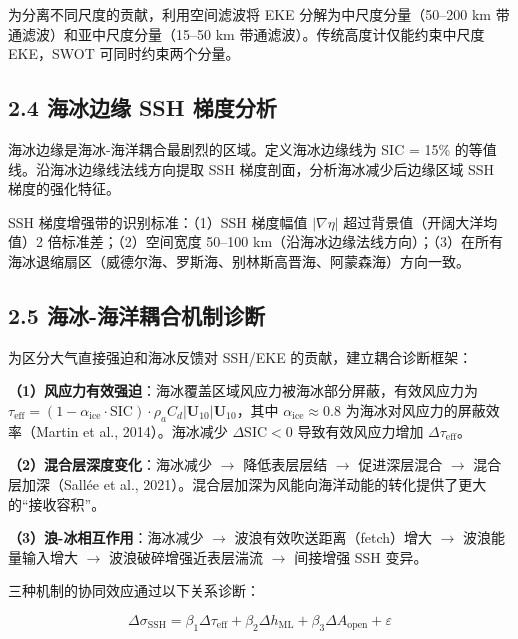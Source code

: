 \documentclass[11pt,a4paper]{article}
\begin{document}
为分离不同尺度的贡献，利用空间滤波将 EKE 分解为中尺度分量（50--200 km 带通滤波）和亚中尺度分量（15--50 km 带通滤波）。传统高度计仅能约束中尺度 EKE，SWOT 可同时约束两个分量。\par

\subsection*{2.4  海冰边缘 SSH 梯度分析}

海冰边缘是海冰-海洋耦合最剧烈的区域。定义海冰边缘线为 SIC = 15\% 的等值线。沿海冰边缘线法线方向提取 SSH 梯度剖面，分析海冰减少后边缘区域 SSH 梯度的强化特征。

SSH 梯度增强带的识别标准：（1）SSH 梯度幅值 $|\nabla\eta|$ 超过背景值（开阔大洋均值）2 倍标准差；（2）空间宽度 50--100 km（沿海冰边缘法线方向）；（3）在所有海冰退缩扇区（威德尔海、罗斯海、别林斯高晋海、阿蒙森海）方向一致。\par

\subsection*{2.5  海冰-海洋耦合机制诊断}

为区分大气直接强迫和海冰反馈对 SSH/EKE 的贡献，建立耦合诊断框架：

\textbf{（1）风应力有效强迫}：海冰覆盖区域风应力被海冰部分屏蔽，有效风应力为 $\tau_{\text{eff}} = (1 - \alpha_{\text{ice}}\cdot\text{SIC})\cdot\rho_a C_d |\mathbf{U}_{10}|\mathbf{U}_{10}$，其中 $\alpha_{\text{ice}} \approx 0.8$ 为海冰对风应力的屏蔽效率（Martin et al., 2014）。海冰减少 $\Delta\text{SIC} < 0$ 导致有效风应力增加 $\Delta\tau_{\text{eff}}$。\par

\textbf{（2）混合层深度变化}：海冰减少 $\to$ 降低表层层结 $\to$ 促进深层混合 $\to$ 混合层加深（Sallée et al., 2021）。混合层加深为风能向海洋动能的转化提供了更大的``接收容积''。\par

\textbf{（3）浪-冰相互作用}：海冰减少 $\to$ 波浪有效吹送距离（fetch）增大 $\to$ 波浪能量输入增大 $\to$ 波浪破碎增强近表层湍流 $\to$ 间接增强 SSH 变异。\par

三种机制的协同效应通过以下关系诊断：

\begin{equation}
\Delta\sigma_{\text{SSH}} = \beta_1\Delta\tau_{\text{eff}} + \beta_2\Delta h_{\text{ML}} + \beta_3\Delta A_{\text{open}} + \varepsilon
\end{equation}
\end{document}
